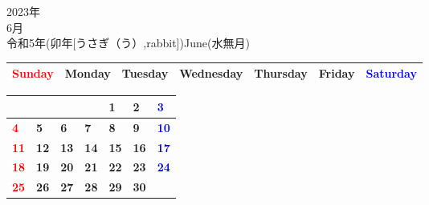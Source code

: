 \documentclass[a4paper,landscape]{jsarticle}
\newcommand{\dig}{\hspace{29mm}}
\newcommand{\tdig}{\hspace{27mm}}
\newcommand{\LBF}{\LARGE\textbf}
\begin{document}
\newpage

\begin{center}
	\HUGE 2023年\\
	\huge 6月\\
	\large 令和5年(卯年[うさぎ（う）,rabbit])June(水無月)
\end{center}

\begingroup
\renewcommand{\arraystretch}{1.4}
\begin{tabular}{|>{\centering\arraybackslash}p{32mm}|>{\centering\arraybackslash}p{32mm}|>{\centering\arraybackslash}p{32mm}|>{\centering\arraybackslash}p{32mm}|>{\centering\arraybackslash}p{32mm}|>{\centering\arraybackslash}p{32mm}|>{\centering\arraybackslash}p{32mm}|}
\hline
\textcolor{red}{\large Sunday}&\large Monday&\large Tuesday&\large Wednesday&\large Thursday&\large Friday&\textcolor{blue}{\large Saturday}\\
\hline
\end{tabular}
\endgroup

\begingroup
\renewcommand{\arraystretch}{4}
\begin{tabular}{|p{32mm}|p{32mm}|p{32mm}|p{32mm}|p{32mm}|p{32mm}|p{32mm}|}
\hline
&&&&\raisebox{30pt} {\dig\LBF{1}}&\raisebox{30pt} {\dig\LBF{2}}&\raisebox{30pt} {\dig\textcolor{blue}{\LBF{3}}}\\
\hline
\raisebox{30pt} {\dig\textcolor{red}{\LBF{4}}}&\raisebox{30pt} {\dig\LBF{5}}&\raisebox{30pt} {\dig\LBF{6}}&\raisebox{30pt} {\dig\LBF{7}}&\raisebox{30pt} {\dig\LBF{8}}&\raisebox{30pt} {\dig\LBF{9}}&\raisebox{30pt} {\tdig\textcolor{blue}{\LBF{10}}}\\
\hline
\raisebox{30pt} {\tdig\textcolor{red}{\LBF{11}}}&\raisebox{30pt} {\tdig\LBF{12}}&\raisebox{30pt} {\tdig\LBF{13}}&\raisebox{30pt} {\tdig\LBF{14}}&\raisebox{30pt} {\tdig\LBF{15}}&\raisebox{30pt} {\tdig\LBF{16}}&\raisebox{30pt} {\tdig\textcolor{blue}{\LBF{17}}}\\
\hline
\raisebox{30pt} {\tdig\textcolor{red}{\LBF{18}}}&\raisebox{30pt} {\tdig\LBF{19}}&\raisebox{30pt} {\tdig\LBF{20}}&\raisebox{30pt} {\tdig\LBF{21}}&\raisebox{30pt} {\tdig\LBF{22}}&\raisebox{30pt} {\tdig\LBF{23}}&\raisebox{30pt} {\tdig\textcolor{blue}{\LBF{24}}}\\
\hline
\raisebox{30pt} {\tdig\textcolor{red}{\LBF{25}}}&\raisebox{30pt} {\tdig\LBF{26}}&\raisebox{30pt} {\tdig\LBF{27}}&\raisebox{30pt} {\tdig\LBF{28}}&\raisebox{30pt} {\tdig\LBF{29}}&\raisebox{30pt} {\tdig\LBF{30}}&\\
\hline
\end{tabular}
\endgroup
\end{document}
